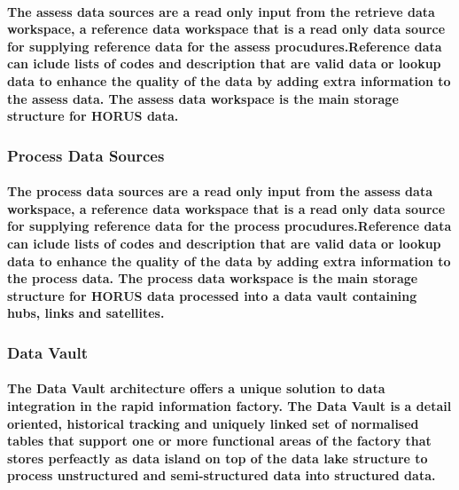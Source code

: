 \documentclass{acm_proc_article-sp}
\begin{document}
\paragraph{The assess data sources are a read only input from the retrieve data workspace, a reference data workspace that is a read only data source for supplying reference data for the assess procudures.Reference data can iclude lists of codes and description that are valid data or lookup data to enhance the quality of the data by adding extra information to the assess data. The assess data workspace is the main storage structure for HORUS data.}
\subsubsection{Process Data Sources}
\paragraph{The process data sources are a read only input from the assess data workspace, a reference data workspace that is a read only data source for supplying reference data for the process procudures.Reference data can iclude lists of codes and description that are valid data or lookup data to enhance the quality of the data by adding extra information to the process data. The process data workspace is the main storage structure for HORUS data processed into a data vault containing hubs, links and satellites. }
\subsubsection{Data Vault}
\paragraph{The Data Vault architecture offers a unique solution to data integration in the rapid information factory. The Data Vault is a detail oriented, historical tracking and uniquely linked set of normalised tables that support one or more functional areas of the factory that stores perfeactly as data island on top of the data lake structure to process unstructured and semi-structured data into structured data.}
\end{document}
